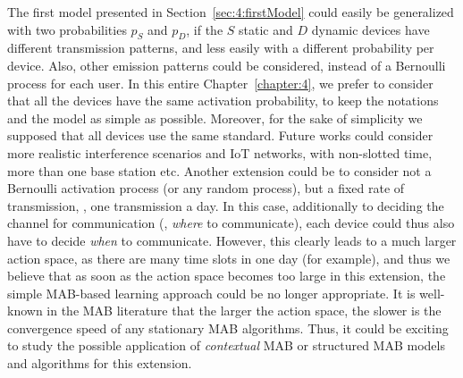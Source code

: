 The first model presented in Section~\ref{sec:4:firstModel} could easily be generalized with two probabilities $p_S$ and $p_D$, if the $S$ static and $D$ dynamic devices have different transmission patterns, and less easily with a different probability per device.
Also, other emission patterns could be considered, instead of a Bernoulli process for each user.
In this entire Chapter~\ref{chapter:4}, we prefer to consider that all the devices have the same activation probability, to keep the notations and the model as simple as possible.
%
Moreover, for the sake of simplicity we supposed that all devices use the same standard.
Future works could consider more realistic interference scenarios and IoT networks, with non-slotted time, more than one base station etc.
Another extension could be to consider not a Bernoulli activation process (or any random process), but a fixed rate of transmission, \eg, one transmission a day.
In this case, additionally to deciding the channel for communication (\ie, \emph{where} to communicate), each device could thus also have to decide \emph{when} to communicate.
However, this clearly leads to a much larger action space, as there are many time slots in one day (for example), and thus we believe that as soon as the action space becomes too large in this extension, the simple MAB-based learning approach could be no longer appropriate.
It is well-known in the MAB literature that the larger the action space, the slower is the convergence speed of any stationary MAB algorithms.
Thus, it could be exciting to study the possible application of \emph{contextual} MAB \cite{Li10,Luo18} or structured MAB \cite{Combes17} models and algorithms for this extension.
%
%
%

